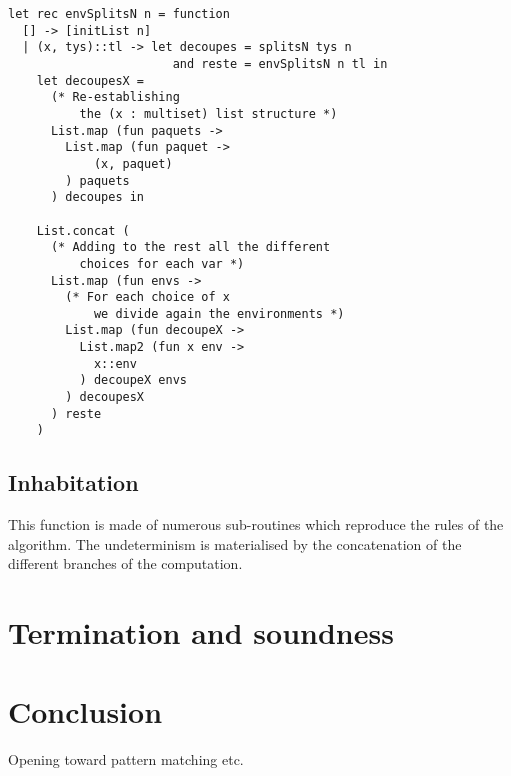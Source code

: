\documentclass{article}
\begin{document}
\begin{lstlisting}[caption={Partitions of an environment}]
let rec envSplitsN n = function
  [] -> [initList n]
  | (x, tys)::tl -> let decoupes = splitsN tys n 
                       and reste = envSplitsN n tl in
    let decoupesX = 
      (* Re-establishing 
          the (x : multiset) list structure *)
      List.map (fun paquets -> 
        List.map (fun paquet -> 
            (x, paquet)
        ) paquets
      ) decoupes in
            
    List.concat (
      (* Adding to the rest all the different
          choices for each var *)
      List.map (fun envs -> 
        (* For each choice of x 
            we divide again the environments *)
        List.map (fun decoupeX -> 
          List.map2 (fun x env -> 
            x::env
          ) decoupeX envs
        ) decoupesX
      ) reste
    )
\end{lstlisting}

\subsection{Inhabitation}
This function is made of numerous sub-routines which reproduce the rules of the algorithm. The undeterminism is materialised by the concatenation of the different branches of the computation.

\section{Termination and soundness}

\section{Conclusion}
    Opening toward pattern matching etc.
\newpage


\end{document}
